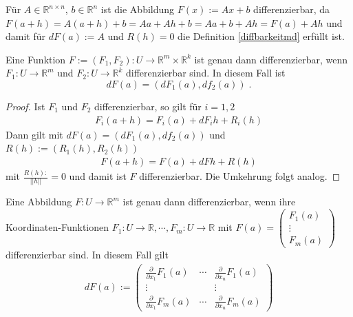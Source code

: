 \begin{Beispiel}
Für $A \in \mathbb{R}^{n \times n}$, $b \in \mathbb{R}^n$  ist die Abbildung $F(x) := Ax +b$ differenzierbar, da
$F(a +h) = A(a+h) + b = A a+ Ah +b = Aa +b + Ah = F(a) + Ah$ und damit für $dF(a) := A$ und $R(h) = 0$ die Definition \ref{diffbarkeitmd}
 erfüllt ist.
\end{Beispiel}

\begin{Satz}
Eine Funktion $F:= (F_1, F_2) : U  \to \mathbb{R}^m \times \mathbb{R}^k$ ist genau dann differenzierbar, 
wenn $F_1 : U  \to \mathbb{R}^m$ und   $F_2 : U  \to \mathbb{R}^k$ differenzierbar sind. In diesem Fall ist
$$dF(a) = (dF_1(a), df_2 (a)) \;.$$ 
\end{Satz}
\begin{proof}
Ist $F_1$ und $F_2$ differenzierbar, so gilt für $i = 1,2$
\begin{align*}
F_i (a + h) = F_i(a) + dF_ih + R_i(h)
\end{align*}
Dann gilt mit $dF(a) = (dF_1(a), df_2 (a))$ und $R(h):= (R_1(h), R_2(h))$
\begin{align*}
F (a + h) = F (a) + dF h + R(h)
\end{align*}
mit $\frac{R(h):}{||h||} = 0$ und damit ist $F$ differenzierbar. Die Umkehrung folgt analog.
\end{proof}

\begin{Bemerkung}
Eine Abbildung $F : U \to \mathbb{R}^m$ ist genau dann  differenzierbar, wenn ihre Koordinaten-Funktionen 
$F_1 : U \to \mathbb{R},  \cdots, F_m : U \to \mathbb{R}$ mit $F(a) = \begin{pmatrix} F_1(a) \\ \vdots \\ F_m(a) \end{pmatrix}$ differenzierbar sind. In diesem Fall gilt
\begin{align*}
dF(a) :=   \begin{pmatrix}  \frac{\partial}{\partial x_1}  F_1(a) & \cdots & \frac{\partial}{\partial x_n} F_1(a) \\ 
\vdots & & \vdots \\
\frac{\partial}{\partial x_1}  F_m(a) & \cdots & \frac{\partial}{\partial x_n} F_m(a) 
\end{pmatrix}
\end{align*}
\end{Bemerkung}

